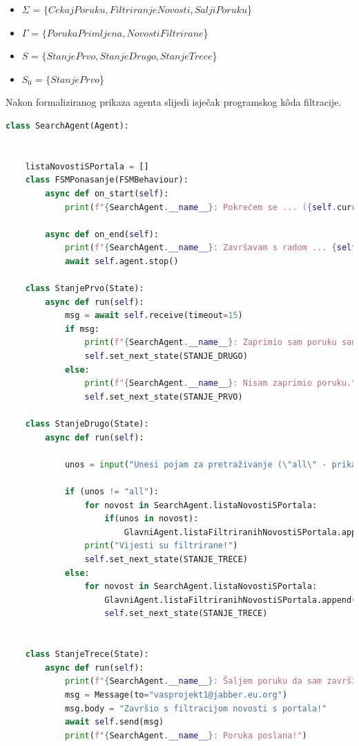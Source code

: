 \documentclass[]{foi} %
\begin{document}
\begin{itemize}
  \item \(\Sigma\) = $\{CekajPoruku, FiltriranjeNovosti, SaljiPoruku$\}
  \item \(\Gamma\) = $\{PorukaPrimljena, NovostiFiltrirane$\}
  \item \(S\) = $\{StanjePrvo, StanjeDrugo, StanjeTrece$\}
  \item \(S_0\) = $\{StanjePrvo$\}
\end{itemize}

Nakon formaliziranog prikaza  agenta slijedi isječak programskog kôda filtracije.

\begin{lstlisting}[language=Python, caption={Programski kôd za SearchAgent agenta}]
class SearchAgent(Agent):


    listaNovostiSPortala = []
    class FSMPonasanje(FSMBehaviour):
        async def on_start(self):
            print(f"{SearchAgent.__name__}: Pokrećem se ... ({self.current_state})")

        async def on_end(self):
            print(f"{SearchAgent.__name__}: Završavam s radom ... {self.current_state}")
            await self.agent.stop()

    class StanjePrvo(State):
        async def run(self):
            msg = await self.receive(timeout=15)
            if msg:
                print(f"{SearchAgent.__name__}: Zaprimio sam poruku sadržaja: \"{msg.body}\"")
                self.set_next_state(STANJE_DRUGO)
            else:
                print(f"{SearchAgent.__name__}: Nisam zaprimio poruku.")
                self.set_next_state(STANJE_PRVO)
            
    class StanjeDrugo(State):
        async def run(self):
            
            unos = input("Unesi pojam za pretraživanje (\"all\" - prikaz svih vijesti): ")

            if (unos != "all"):
                for novost in SearchAgent.listaNovostiSPortala:
                    if(unos in novost):
                        GlavniAgent.listaFiltriranihNovostiSPortala.append(novost)
                print("Vijesti su filtrirane!")
                self.set_next_state(STANJE_TRECE)
            else:
                for novost in SearchAgent.listaNovostiSPortala:
                    GlavniAgent.listaFiltriranihNovostiSPortala.append(f"{novost}")
                    self.set_next_state(STANJE_TRECE)


    class StanjeTrece(State):
        async def run(self):
            print(f"{SearchAgent.__name__}: Šaljem poruku da sam završio s filtriranjem novosti ...")
            msg = Message(to="vasprojekt1@jabber.eu.org")
            msg.body = "Završio s filtracijom novosti s portala!"
            await self.send(msg)
            print(f"{SearchAgent.__name__}: Poruka poslana!")   


\end{lstlisting}
\end{document}
